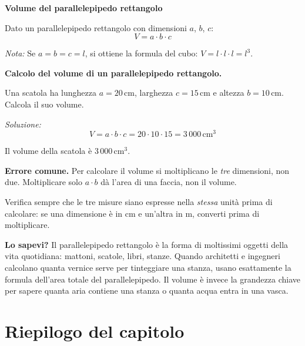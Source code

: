 \begin{regola}
    \textbf{Volume del parallelepipedo rettangolo}

    Dato un parallelepipedo rettangolo con dimensioni $a$, $b$, $c$:
    \[
        V = a \cdot b \cdot c
    \]

    \medskip
    \textit{Nota:} Se $a = b = c = l$, si ottiene la formula del cubo: $V = l \cdot l \cdot l = l^3$.
\end{regola}

\begin{esempio}
    \textbf{Calcolo del volume di un parallelepipedo rettangolo.}

    Una scatola ha lunghezza $a = 20\,\text{cm}$, larghezza $c = 15\,\text{cm}$ e altezza $b = 10\,\text{cm}$. Calcola il suo volume.

    \medskip
    \textit{Soluzione:}
    \[
        V = a \cdot b \cdot c = 20 \cdot 10 \cdot 15 = 3\,000\,\text{cm}^3
    \]

    Il volume della scatola è $3\,000\,\text{cm}^3$.
\end{esempio}

\begin{attenzione}
    \textbf{Errore comune.} Per calcolare il volume si moltiplicano le \emph{tre} dimensioni, non due. Moltiplicare solo $a \cdot b$ dà l'area di una faccia, non il volume.

    \medskip
    Verifica sempre che le tre misure siano espresse nella \emph{stessa} unità prima di calcolare: se una dimensione è in cm e un'altra in m, converti prima di moltiplicare.
\end{attenzione}

\begin{sapevi}
    \textbf{Lo sapevi?} Il parallelepipedo rettangolo è la forma di moltissimi oggetti della vita quotidiana: mattoni, scatole, libri, stanze. Quando architetti e ingegneri calcolano quanta vernice serve per tinteggiare una stanza, usano esattamente la formula dell'area totale del parallelepipedo. Il volume è invece la grandezza chiave per sapere quanta aria contiene una stanza o quanta acqua entra in una vasca.
\end{sapevi}

\section{Riepilogo del capitolo}

